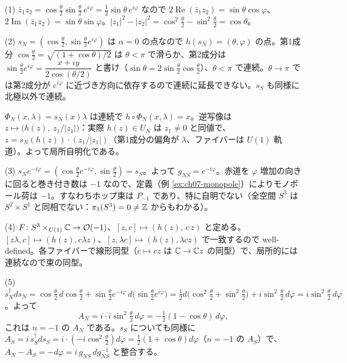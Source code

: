 \begin{solution}
(1) $\bar z_1z_2=\cos\frac\theta2\sin\frac\theta2\,e^{i\varphi}=\frac12\sin\theta\,e^{i\varphi}$ なので $2\operatorname{Re}(\bar z_1z_2)=\sin\theta\cos\varphi$、$2\operatorname{Im}(\bar z_1z_2)=\sin\theta\sin\varphi$。$\lvert z_1\rvert^2-\lvert z_2\rvert^2=\cos^2\frac\theta2-\sin^2\frac\theta2=\cos\theta$。

(2) $s_N=(\cos\frac\theta2,\sin\frac\theta2e^{i\varphi})$ は $\alpha=0$ の点なので $h(s_N)=(\theta,\varphi)$ の点。第1成分 $\cos\frac\theta2=\sqrt{(1+\cos\theta)/2}$ は $\theta<\pi$ で滑らか、第2成分は $\sin\frac\theta2e^{i\varphi}=\dfrac{x+iy}{2\cos(\theta/2)}$ と書け（$\sin\theta=2\sin\frac\theta2\cos\frac\theta2$）、$\theta<\pi$ で連続。$\theta\to\pi$ では第2成分が $e^{i\varphi}$ に近づき方向に依存するので連続に延長できない。$s_S$ も同様に北極以外で連続。

$\Phi_N(x,\lambda)=s_N(x)\lambda$ は連続で $h\circ\Phi_N(x,\lambda)=x$。逆写像は $z\mapsto\bigl(h(z),\ z_1/\lvert z_1\rvert\bigr)$：実際 $h(z)\in U_N$ は $z_1\neq0$ と同値で、$z=s_N(h(z))\cdot(z_1/\lvert z_1\rvert)$（第1成分の偏角が $\lambda$、ファイバーは $U(1)$ 軌道）。よって局所自明化である。

(3) $s_Ne^{-i\varphi}=(\cos\frac\theta2e^{-i\varphi},\sin\frac\theta2)=s_S$。よって $g_{NS}=e^{-i\varphi}$。赤道を $\varphi$ 増加の向きに回ると巻き付き数は $-1$ なので、定義（例 \ref{ex:ch07-monopole}）によりモノポール荷は $-1$。すなわちホップ束は $P_{-1}$ であり、特に自明でない（全空間 $S^3$ は $S^2\times S^1$ と同相でない：$\pi_1(S^3)=0\neq\mathbb{Z}$ からもわかる）。

(4) $F\colon S^3\times_{U(1)}\mathbb{C}\to\mathcal O(-1)$、$[z,c]\mapsto(h(z),\,c\,z)$ と定める。$[z\lambda,c]\mapsto(h(z),c\lambda z)$、$[z,\lambda c]\mapsto(h(z),\lambda c z)$ で一致するので well-defined。各ファイバーで線形同型（$c\mapsto cz$ は $\mathbb{C}\to\mathbb{C} z$ の同型）で、局所的には連続なので束の同型。

(5) $s_N^\dagger ds_N=\cos\frac\theta2\,d\cos\frac\theta2+\sin\frac\theta2e^{-i\varphi}\,d\bigl(\sin\frac\theta2e^{i\varphi}\bigr)=\tfrac12d\bigl(\cos^2\tfrac\theta2+\sin^2\tfrac\theta2\bigr)+i\sin^2\tfrac\theta2\,d\varphi=i\sin^2\tfrac\theta2\,d\varphi$。よって
\[
A_N=i\cdot i\sin^2\tfrac\theta2\,d\varphi=-\tfrac12(1-\cos\theta)\,d\varphi,
\]
これは $n=-1$ の $A_N$ である。$s_S$ についても同様に $A_S=i\,s_S^\dagger ds_S=i\cdot(-i\cos^2\frac\theta2)d\varphi=\frac12(1+\cos\theta)d\varphi$（$n=-1$ の $A_S$）で、$A_N-A_S=-d\varphi=i\,g_{NS}\,dg_{NS}^{-1}$ と整合する。
\end{solution}

